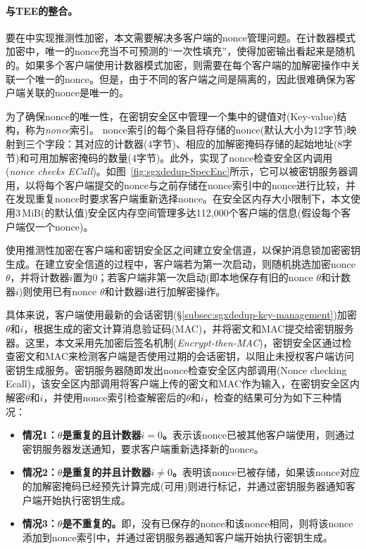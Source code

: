 \paragraph*{与TEE的整合。}要在\sysnameS 中实现推测性加密，本文需要解决多客户端的nonce管理问题。在计数器模式加密中，唯一的nonce充当不可预测的“一次性填充”，使得加密输出看起来是随机的。如果多个客户端使用计数器模式加密，则需要在每个客户端的加解密操作中关联一个唯一的nonce。但是，由于不同的客户端之间是隔离的，因此很难确保为客户端关联的nonce是唯一的。

为了确保nonce的唯一性，\sysnameS 在密钥安全区中管理一个集中的键值对(Key-value)结构，称为\textit{nonce}索引。 nonce索引的每个条目将存储的nonce(默认大小为12字节)映射到三个字段：其对应的计数器(4字节)、相应的加解密掩码存储的起始地址(8字节)和可用加解密掩码的数量(4字节)。此外，\sysnameS 实现了nonce检查安全区内调用(\textit{nonce checks ECall})。如图~\ref{fig:sgxdedup-SpecEnc}所示，它可以被密钥服务器调用，以将每个客户端提交的nonce与之前存储在nonce索引中的nonce进行比较，并在发现重复nonce时要求客户端重新选择nonce。在安全区内存大小限制下，本文使用3\,MiB(\sysnameS 的默认值)安全区内存空间管理多达112,000个客户端的信息(假设每个客户端仅一个nonce)。

\sysnameS 使用推测性加密在客户端和密钥安全区之间建立安全信道，以保护消息锁加密密钥生成。在建立安全信道的过程中，客户端若为第一次启动，则随机挑选加密nonce $\theta$，并将计数器$i$置为0；若客户端非第一次启动(即本地保存有旧的nonce $\theta$和计数器$i$)则使用已有nonce $\theta$和计数器i进行加解密操作。

具体来说，客户端使用最新的会话密钥(\S\ref{subsec:sgxdedup-key-management})加密$\theta$和$i$，根据生成的密文计算消息验证码(MAC)，并将密文和MAC提交给密钥服务器。这里，本文采用先加密后签名机制(\textit{Encrypt-then-MAC})，密钥安全区通过检查密文和MAC来检测客户端是否使用过期的会话密钥，以阻止未授权客户端访问密钥生成服务。密钥服务器随即发出nonce检查安全区内部调用(Nonce checking Ecall)，该安全区内部调用将客户端上传的密文和MAC作为输入，在密钥安全区内解密$\theta$和$i$，并使用nonce索引检查解密后的$\theta$和$i$，检查的结果可分为如下三种情况：

\begin{itemize}[leftmargin=0em]
  \item \textbf{情况1：$\theta$是重复的且计数器$i = 0$。}表示该nonce已被其他客户端使用，则通过密钥服务器发送通知，要求客户端重新选择新的nonce。
  \item \textbf{情况2：$\theta$是重复的并且计数器$i \neq 0$。}表明该nonce已被存储，如果该nonce对应的加解密掩码已经预先计算完成(可用)则进行标记，并通过密钥服务器通知客户端开始执行密钥生成。
  \item \textbf{情况3：$\theta$是不重复的。}即，没有已保存的nonce和该nonce相同，则将该nonce添加到nonce索引中，并通过密钥服务器通知客户端开始执行密钥生成。
\end{itemize}

